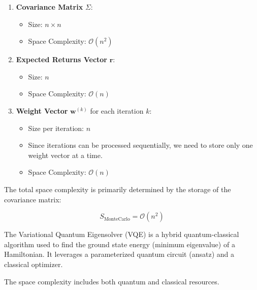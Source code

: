 \documentclass[%
 reprint,
 amsmath,amssymb,
 aps,
]{revtex4-2}
\begin{document}
\begin{enumerate} \item \textbf{Covariance Matrix} $\Sigma$: \begin{itemize} \item Size: $n \times n$ \item Space Complexity: $\mathcal{O}(n^2)$ \end{itemize}

\item \textbf{Expected Returns Vector} $\mathbf{r}$:
\begin{itemize}
    \item Size: $n$
    \item Space Complexity: $\mathcal{O}(n)$
\end{itemize}

\item \textbf{Weight Vector} $\mathbf{w}^{(k)}$ for each iteration $k$:
\begin{itemize}
    \item Size per iteration: $n$
    \item Since iterations can be processed sequentially, we need to store only one weight vector at a time.
    \item Space Complexity: $\mathcal{O}(n)$
\end{itemize}
\end{enumerate}

The total space complexity is primarily determined by the storage of the covariance matrix:

\begin{equation} S_{\text{MonteCarlo}} = \mathcal{O}(n^2) \end{equation}

The Variational Quantum Eigensolver (VQE)\cite{Peruzzo2014} is a hybrid quantum-classical algorithm used to find the ground state energy (minimum eigenvalue) of a Hamiltonian. It leverages a parameterized quantum circuit (ansatz) and a classical optimizer\cite{McClean2016}.

The space complexity includes both quantum and classical resources.
\end{document}
